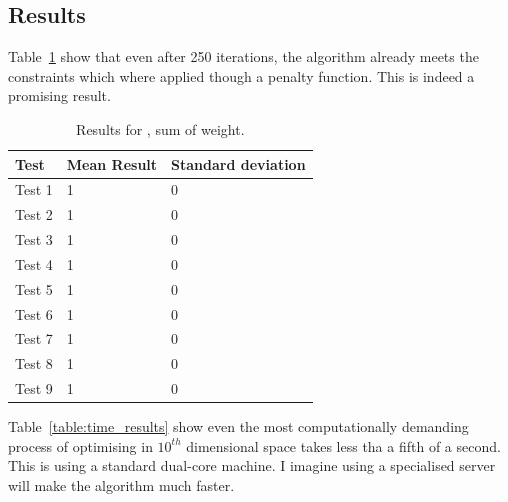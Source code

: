\documentclass{pdfmx4020}
\begin{document}
    \subsection{Results} %
    \label{sub:results}
      Table~\ref{table:sum_weight_results} show that even after 250 iterations, the algorithm already meets the constraints which where applied though a penalty function. This is indeed a promising result.
        \begin{table}[H]
          \setlength{\extrarowheight}{2.0pt}
          \begin{tabular}{|l|l|l|}
            \hline
            Test & Mean Result & Standard deviation \\
            \hline
            Test 1 & 1 & 0 \\
            \hline
            Test 2 & 1 & 0 \\
            \hline
            Test 3 & 1 & 0 \\
            \hline
            Test 4 & 1 & 0 \\
            \hline
            Test 5 & 1 & 0 \\
            \hline
            Test 6 & 1 & 0 \\
            \hline
            Test 7 & 1 & 0 \\
            \hline
            Test 8 & 1 & 0 \\
            \hline
            Test 9 & 1 & 0 \\
            \hline
          \end{tabular}
          \caption{Results for , sum of weight.}
          \label{table:sum_weight_results}
        \end{table}
      Table~\ref{table:time_results} show even the most computationally demanding process of optimising in $10^{th}$ dimensional space takes less tha a fifth of a second. This is using a standard dual-core machine. I imagine using a specialised server will make the algorithm much faster. 
\end{document}
